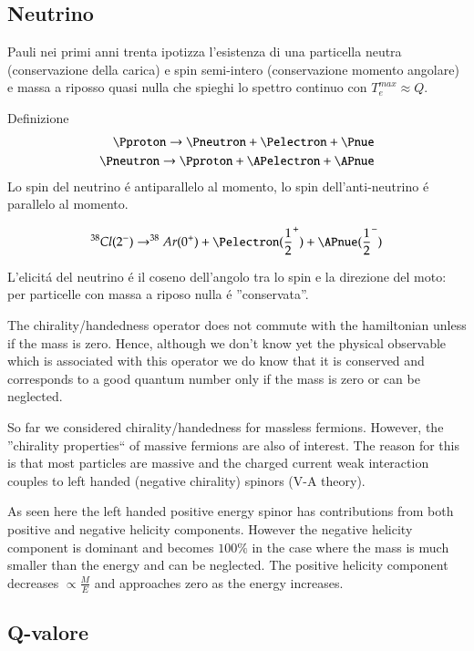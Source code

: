 \documentclass[main.tex]{subfiles}
\begin{document}
\subsection{Neutrino}
Pauli nei primi anni trenta ipotizza l'esistenza di una particella neutra (conservazione della carica) e spin semi-intero (conservazione momento angolare) e massa a riposso quasi nulla che spieghi lo spettro continuo con $T_e^{max}\approx Q$.

Definizione
\begin{align*}
\Pproton\to\Pneutron+\Pelectron+\Pnue\\
\Pneutron\to\Pproton+\APelectron+\APnue
\end{align*}
Lo spin del neutrino \'e antiparallelo al momento, lo spin dell'anti-neutrino \'e parallelo al momento.

\begin{equation*}
^{38}Cl(2^-)\to^{38}Ar(0^+)+\Pelectron(\frac{1}{2}^+)+\APnue(\frac{1}{2}^-)
\end{equation*}

L'elicit\'a del neutrino \'e il coseno dell'angolo tra lo spin e la direzione del moto: per particelle con massa a riposo nulla \'e ''conservata''.

The chirality/handedness operator does not commute with the hamiltonian unless if the mass is zero. Hence, although we don't know yet the physical observable which is associated with this operator we do know that it is conserved and corresponds to a good quantum number only if the mass is zero or can be neglected.

So far we considered chirality/handedness for massless fermions. However, the ''chirality properties`` of massive fermions are also of interest. The reason for this is that most particles are massive and the charged current weak interaction couples to left handed (negative chirality) spinors (V-A theory).

As seen here the left handed positive energy spinor has contributions from both positive and negative helicity components. However the negative helicity component is dominant and becomes $100\%$ in the case where the mass is much smaller than the energy and can be neglected. The positive helicity component decreases $\propto\frac{M}{E}$	and approaches zero as the energy increases.

\subsection{Q-valore}
\end{document}
